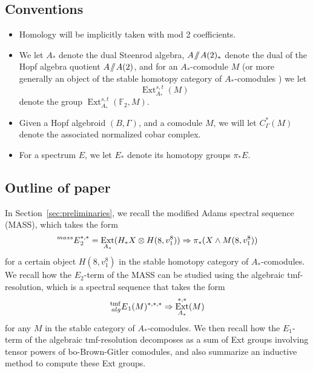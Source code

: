 \documentclass[10pt]{amsart}
\newcommand{\sslash}{\mathbin{/\mkern-6mu/}}
\newcommand{\mmod}{\! \sslash \!}
\newcommand{\ul}[1]{\underline{#1}}
\newcommand{\FF}{\mathbb{F}}
\newcommand{\tmf}{\mathrm{tmf}}
\theoremstyle{definition}
\numberwithin{equation}{section}
\numberwithin{figure}{section}
\DeclareMathOperator{\Ext}{Ext}
\newcommand{\E}[2]{\prescript{#1}{#2}{E}}
\begin{document}
\subsection*{Conventions}

\begin{itemize}
\item Homology will be implicitly taken with mod 2 coefficients.

\item
We let $A_*$ denote the dual Steenrod algebra, $A\mmod A(2)_*$ denote the dual of the Hopf algebra quotient $A\mmod A(2)$, and for an $A_*$-comodule $M$ (or more generally an object of the stable homotopy category of $A_*$-comodules \cite{Hovey}) we let
$$ \Ext^{s,t}_{A_*}(M) $$
denote the group $\Ext^{s,t}_{A_*}(\FF_2, M)$.  

\item Given a Hopf algebroid $(B, \Gamma)$, and a comodule $M$, we will let $C^*_\Gamma(M)$ denote the associated normalized cobar complex.

\item For a spectrum $E$, we let $E_*$ denote its homotopy groups $\pi_*E$.
\end{itemize}

\subsection*{Outline of paper}

In Section~\ref{sec:preliminaries}, we recall the modified Adams spectral sequence (MASS), which takes the form
$$ \E{mass}{}_2^{*,*} = \Ext_{A_*}(H_*X \otimes H(8,v_1^8)) \Rightarrow \pi_*(X \wedge M(8,v_1^8)) $$
for a certain object $H(8,v_1^8)$ in the stable homotopy category of $A_*$-comodules.
We recall how the $E_2$-term of the MASS can be studied using the algebraic 
tmf-resolution, which is a spectral sequence that takes the form
$$ \E{\tmf}{alg}_1(M)^{*,*,*} \Rightarrow \Ext^{*,*}_{A_*}(M) $$
for any $M$ in the stable category of $A_*$-comodules.
We then recall how the $E_1$-term of the algebraic tmf-resolution decomposes as a sum of Ext groups involving tensor powers of bo-Brown-Gitler comodules, and also summarize an inductive method to compute these Ext groups.
\end{document}
